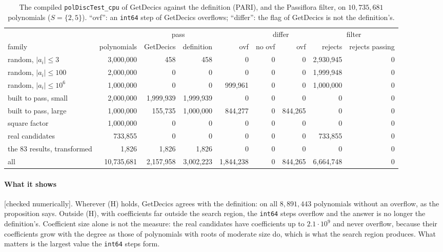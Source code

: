 \documentclass[10pt,a4paper]{article}
\newcommand{\code}[1]{\texttt{#1}}
\newcommand{\stnum}{\textsf{\small[checked numerically]}\xspace}
\theoremstyle{plain}
\theoremstyle{definition}
\begin{document}
\begin{table}[ht]
\centering\footnotesize\setlength{\tabcolsep}{4pt}
\caption{The compiled \code{polDiscTest\_cpu} of GetDecics against the definition (PARI), and the Passiflora filter, on $10{,}735{,}681$ polynomials ($S=\{2,5\}$).
``ovf'': an \code{int64} step of GetDecics overflows; ``differ'': the flag of GetDecics is not the definition's.}\label{tab:poldisc}
\begin{tabular}{@{}lrrrrrrrr@{}}
\toprule
& & \multicolumn{2}{c}{pass} & & \multicolumn{2}{c}{differ} & \multicolumn{2}{c}{filter} \\ \cmidrule(lr){3-4} \cmidrule(lr){6-7} \cmidrule(l){8-9}
family & polynomials & GetDecics & definition & ovf & no ovf & ovf & rejects & rejects passing \\ \midrule
random, $|a_i|\le3$ & 3,000,000 & 458 & 458 & 0 & 0 & 0 & 2,930,945 & 0 \\
random, $|a_i|\le100$ & 2,000,000 & 0 & 0 & 0 & 0 & 0 & 1,999,948 & 0 \\
random, $|a_i|\le10^6$ & 1,000,000 & 0 & 0 & 999,961 & 0 & 0 & 1,000,000 & 0 \\
built to pass, small & 2,000,000 & 1,999,939 & 1,999,939 & 0 & 0 & 0 & 0 & 0 \\
built to pass, large & 1,000,000 & 155,735 & 1,000,000 & 844,277 & 0 & 844,265 & 0 & 0 \\
square factor & 1,000,000 & 0 & 0 & 0 & 0 & 0 & 0 & 0 \\
real candidates & 733,855 & 0 & 0 & 0 & 0 & 0 & 733,855 & 0 \\
the $83$ results, transformed & 1,826 & 1,826 & 1,826 & 0 & 0 & 0 & 0 & 0 \\ \midrule
all & 10,735,681 & 2,157,958 & 3,002,223 & 1,844,238 & 0 & 844,265 & 6,664,748 & 0 \\
\bottomrule
\end{tabular}
\end{table}

\paragraph{What it shows} \stnum.  Wherever (H) holds, GetDecics agrees with the definition: on all $8{,}891{,}443$ polynomials without an overflow, as the
proposition says.  Outside (H), with coefficients far outside the search region, the \code{int64} steps overflow and the answer is no longer the definition's.
Coefficient size alone is not the measure: the real candidates have coefficients up to $2.1\cdot10^9$ and never overflow, because their coefficients grow with the
degree as those of polynomials with roots of moderate size do, which is what the search region produces.  What matters is the largest value the \code{int64} steps
form.
\end{document}
